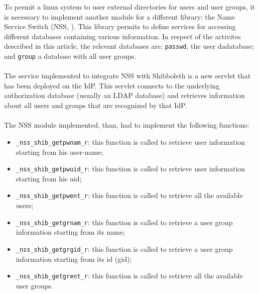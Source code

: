 To permit a linux system to user external directories for users and user groups, it is necessary to implement another module for a different
library: the Name Service Switch (NSS, \cite{GNU-1987}).
This library permits to define services for accessing different databases containing various information.
In respect of the activites described in this article, the relevant databases are: \texttt{passwd}, the user dadatabase; and \texttt{group}
a database with all user groups.\\
\\
The service implemented to integrate NSS with Shibboleth is a new servlet that has been deployed on the IdP.
This servlet connects to the underlying authorization database (usually an LDAP database) and retrieves information about all users and groups
that are recognized by that IdP.\\
\\
The NSS module implemented, than, had to implement the following functions:
\begin{itemize}
\item \texttt{\_nss\_shib\_getpwnam\_r}: this function is called to retrieve user information starting from his user-name;
\item \texttt{\_nss\_shib\_getpwuid\_r}: this function is called to retrieve user information starting from his uid;
\item \texttt{\_nss\_shib\_getpwent\_r}: this function is called to retrieve all the available users;
\item \texttt{\_nss\_shib\_getgrnam\_r}: this function is called to retrieve a user group information starting from its name;
\item \texttt{\_nss\_shib\_getgrgid\_r}: this function is called to retrieve a user group information starting from its id (gid);
\item \texttt{\_nss\_shib\_getgrent\_r}: this function is called to retrieve all the available user groups.
\end{itemize}

